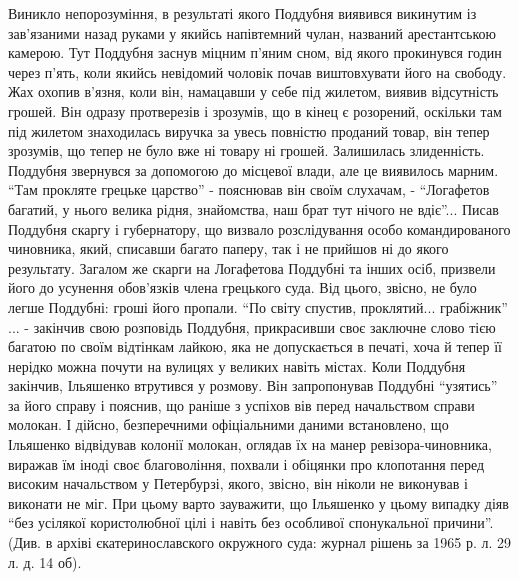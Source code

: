 \documentclass[a4paper,20pt]{report}
\begin{document}
Виникло непорозуміння, в результаті якого Поддубня виявився викинутим із
зав'язаними назад руками у якийсь напівтемний чулан, названий арестантською
камерою. Тут Поддубня заснув міцним п'яним сном, від якого прокинувся годин
через п'ять, коли якийсь невідомий чоловік почав виштовхувати його на свободу.
Жах охопив в'язня, коли він, намацавши у себе під жилетом, виявив відсутність
грошей. Він одразу протверезів і зрозумів, що в кінец є розорений, оскільки там
під жилетом знаходилась виручка за увесь повністю проданий товар, він тепер
зрозумів, що тепер не було вже ні товару ні грошей. Залишилась злиденність.
Поддубня звернувся за допомогою до місцевої влади, але це виявилось марним.
``Там прокляте грецьке царство'' - пояснював він своїм слухачам, - ``Логафетов
багатий, у нього велика рідня, знайомства, наш брат тут нічого не вдіє''...
Писав Поддубня скаргу і губернатору, що визвало розслідування особо
командированого чиновника, який, списавши багато паперу, так і не прийшов ні до
якого результату. Загалом же скарги на Логафетова Поддубні та інших осіб,
призвели його до усунення обов'язків члена грецького суда. Від цього, звісно,
не було легше Поддубні: гроші його пропали. ``По світу спустив, проклятий...
грабіжник'' ... - закінчив свою розповідь Поддубня, прикрасивши своє заключне
слово тією багатою по своїм відтінкам лайкою, яка не допускається в печаті,
хоча й тепер її нерідко можна почути на вулицях у великих навіть містах. Коли
Поддубня закінчив, Ільяшенко втрутився у розмову. Він запропонував Поддубні
``узятись'' за його справу і пояснив, що раніше з успіхов вів перед начальством
справи молокан. І дійсно, безперечними офіціальними даними встановлено, що
Ільяшенко  відвідував колонії молокан, оглядав їх на манер ревізора-чиновника,
виражав їм іноді своє благовоління, похвали і обіцянки про клопотання перед
високим начальством у Петербурзі, якого, звісно, він ніколи не виконував і
виконати не міг. При цьому варто зауважити, що Ільяшенко у цьому випадку діяв
``без усілякої користолюбної цілі і навіть без особливої спонукальної
причини''.  (Див. в архіві єкатеринославского окружного суда: журнал рішень за
1965 р. л. 29 л. д. 14 об).
\end{document}
